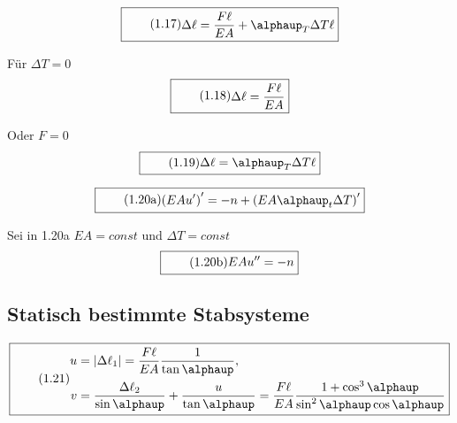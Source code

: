 \documentclass[11pt]{article}
\newcommand{\1}{ {\mathds{1}} }
\newcommand{\abs}[1]{\lvert#1\rvert}
\renewcommand{\alpha  }{\mathit{\alphaup}   }
\begin{document}
		\begin{equation}
			\boxed{
				\tag{1.17}
				\begin{split}
					\Delta \ell
					=
					\frac{F\ell}{EA}
					+
					\alpha_T \Delta T \ell
				\end{split}
			}
		\end{equation}


		Für $\Delta T = 0$
		\begin{equation}
			\boxed{
				\tag{1.18}
				\begin{split}
					\Delta \ell
					=
					\frac{F\ell}{EA}
				\end{split}
			}
		\end{equation}

		Oder $F = 0$
		\begin{equation}
			\boxed{
				\tag{1.19}
				\begin{split}
					\Delta \ell
					=
					\alpha_T \Delta T \ell
				\end{split}
			}
		\end{equation}
		
		\begin{equation}
			\boxed{
				\tag{1.20a}
				\begin{split}
					\left(
						EA u'
					\right)'
					=
					-n
					+
					\left(
						EA \alpha_t \Delta T
					\right)'
				\end{split}
			}
		\end{equation}

		Sei in 1.20a $EA = const$ und $\Delta T = const$
		\begin{equation}
			\boxed{
				\tag{1.20b}
				\begin{split}
					EA u''
					=
					-n
				\end{split}
			}
		\end{equation}


		\subsection{Statisch bestimmte Stabsysteme}

		\begin{equation}
			\boxed{
				\tag{1.21}
				\begin{split}
					u
					&=
					\abs{\Delta\ell_1}
					=
					\frac{F\ell}{EA}
					\frac{1}{\tan{\alpha}}
					,\\
					v
					&=
					\frac{\Delta\ell_2}{\sin{\alpha}}
					+
					\frac{u}{\tan{\alpha}}
					=
					\frac{F\ell}{EA}
					\frac{1 + \cos^3\alpha}{\sin^2\alpha \cos \alpha}
				\end{split}
			}
		\end{equation}
\end{document}
